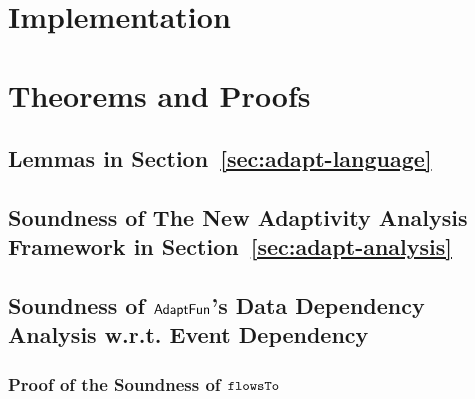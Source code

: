 \section{Implementation}
\label{appendix:implementation}


\section{Theorems and Proofs}
\label{appendix:thm-adaptivity}
\subsection{Lemmas in Section~\ref{sec:adapt-language}}
\label{apdx:lemma_sec123}

\clearpage
\subsection{Soundness of The New Adaptivity Analysis Framework in Section~\ref{sec:adapt-analysis}}
\label{apdx:adapt_soundness}


\clearpage



\clearpage

\subsection{Soundness of $\textsf{AdaptFun}$'s Data Dependency Analysis w.r.t. Event Dependency}
\subsubsection{Proof of the Soundness of $\mathtt{flowsTo}$}
\label{apdx:flowsto_soundness}

\clearpage
